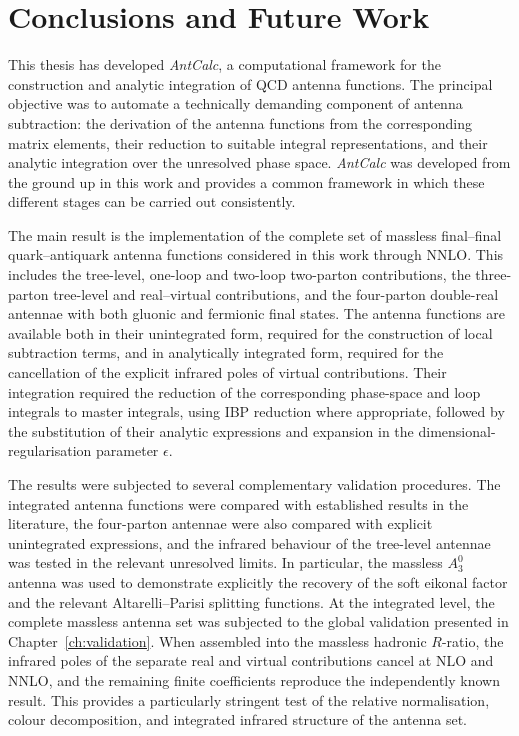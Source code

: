 \chapter{Conclusions and Future Work}\label{ch:conclusion}

This thesis has developed \textit{AntCalc}, a computational framework for the construction and
analytic integration of QCD antenna functions. The principal objective was to automate a technically
demanding component of antenna subtraction: the derivation of the antenna functions from the
corresponding matrix elements, their reduction to suitable integral representations, and their
analytic integration over the unresolved phase space. \textit{AntCalc} was developed from the ground
up in this work and provides a common framework in which these different stages can be carried out
consistently.

The main result is the implementation of the complete set of massless final--final quark--antiquark
antenna functions considered in this work through NNLO. This includes the tree-level, one-loop and
two-loop two-parton contributions, the three-parton tree-level and real--virtual contributions, and
the four-parton double-real antennae with both gluonic and fermionic final states. The antenna
functions are available both in their unintegrated form, required for the construction of local
subtraction terms, and in analytically integrated form, required for the cancellation of the explicit
infrared poles of virtual contributions. Their integration required the reduction of the
corresponding phase-space and loop integrals to master integrals, using IBP reduction where
appropriate, followed by the substitution of their analytic expressions and expansion in the
dimensional-regularisation parameter $\epsilon$.

The results were subjected to several complementary validation procedures. The integrated antenna functions were compared with established results in the literature, the four-parton antennae were also compared with explicit unintegrated expressions, and the infrared behaviour of the tree-level antennae was tested in the relevant unresolved limits. In particular, the massless $A_3^0$ antenna was used to
demonstrate explicitly the recovery of the soft eikonal factor and the relevant Altarelli--Parisi
splitting functions. At the integrated level, the complete massless antenna set was subjected to the
global validation presented in Chapter~\ref{ch:validation}. When assembled into the massless hadronic
$R$-ratio, the infrared poles of the separate real and virtual contributions cancel at NLO and NNLO,
and the remaining finite coefficients reproduce the independently known result. This provides a
particularly stringent test of the relative normalisation, colour decomposition, and integrated
infrared structure of the antenna set.

